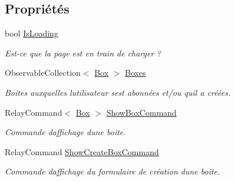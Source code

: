 \subsection*{Propriétés}
\begin{DoxyCompactItemize}
\item 
bool \hyperlink{class_boxes_1_1_view_models_1_1_my_boxes_view_model_a302067001fca3295d9221f46aa905bf7}{Is\+Loading}
\begin{DoxyCompactList}\small\item\em Est-\/ce que la page est en train de charger ? \end{DoxyCompactList}\item 
Observable\+Collection$<$ \hyperlink{class_boxes_1_1_models_1_1_box}{Box} $>$ \hyperlink{class_boxes_1_1_view_models_1_1_my_boxes_view_model_a7087cbe9936e167e3c52eeff4cc8121f}{Boxes}
\begin{DoxyCompactList}\small\item\em Boites auxquelles l\textquotesingle{}utilisateur s\textquotesingle{}est abonnées et/ou qu\textquotesingle{}il a créées. \end{DoxyCompactList}\item 
Relay\+Command$<$ \hyperlink{class_boxes_1_1_models_1_1_box}{Box} $>$ \hyperlink{class_boxes_1_1_view_models_1_1_my_boxes_view_model_a1210f5d646cb1ca103f53bbdf9b67c7a}{Show\+Box\+Command}
\begin{DoxyCompactList}\small\item\em Commande d\textquotesingle{}affichage d\textquotesingle{}une boite. \end{DoxyCompactList}\item 
Relay\+Command \hyperlink{class_boxes_1_1_view_models_1_1_my_boxes_view_model_a1923523832932df6b3278c833ba50ac2}{Show\+Create\+Box\+Command}
\begin{DoxyCompactList}\small\item\em Commande d\textquotesingle{}affichage du formulaire de création d\textquotesingle{}une boite. \end{DoxyCompactList}\end{DoxyCompactItemize}

